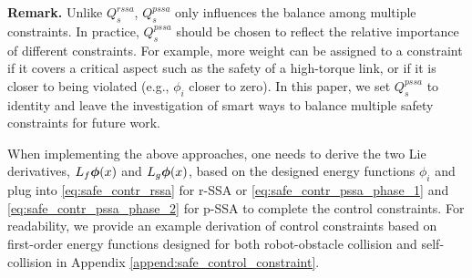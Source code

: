\textbf{Remark.} Unlike $Q^{rssa}_s$, $Q^{pssa}_s$ only influences the balance among multiple constraints.
In practice, $Q^{pssa}_s$ should be chosen to reflect the relative importance of different constraints.
For example, more weight can be assigned to a constraint if it covers a critical aspect such as the safety of a high-torque link, or if it is closer to being violated (e.g., $\phi_i$ closer to zero).
In this paper, we set $Q^{pssa}_s$ to identity and leave the investigation of smart ways to balance multiple safety constraints for future work.

When implementing the above approaches, one needs to derive the two Lie derivatives, $L_f\bm{\phi}(x)$ and $L_g\bm{\phi}(x)$, based on the designed energy functions $\phi_i$ and plug into \eqref{eq:safe_contr_rssa} for r-SSA or \eqref{eq:safe_contr_pssa_phase_1} and \eqref{eq:safe_contr_pssa_phase_2} for p-SSA to complete the control constraints.
For readability, we provide an example derivation of control constraints based on first-order energy functions designed for both robot-obstacle collision and self-collision in Appendix \ref{append:safe_control_constraint}.
